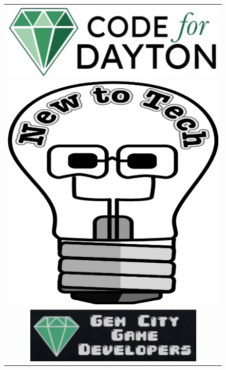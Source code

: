 \documentclass[
  letterpaper,
  DIV=11,
  numbers=noendperiod]{scrartcl}
\begin{document}
\begin{figure}
\begin{minipage}[t]{0.25\linewidth}
{\begin{longtable}[]{@{}c@{}}
\toprule\noalign{}
\endhead
\bottomrule\noalign{}
\endlastfoot
\includegraphics{../img/CodeForDayton.png} \\
\includegraphics{../img/New_To_Tech_Mascot.png} \\
\includegraphics{../img/GemCityGameDevelopers.png} \\
\end{longtable}

}

\end{minipage}%
%
\begin{minipage}[t]{0.10\linewidth}

{\centering 

~

}

\end{minipage}%

\end{figure}
\end{document}
